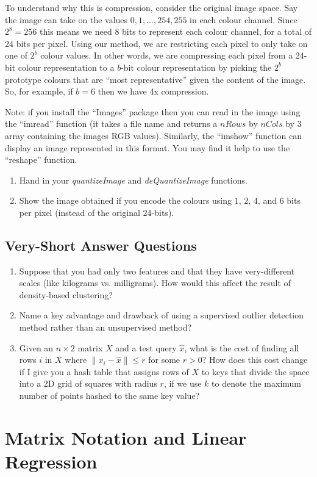 \documentclass{article}
\def\blu#1{{\color{blu}#1}}
\def\norm#1{\|#1\|}
\def\enum#1{\begin{enumerate}#1\end{enumerate}}
\begin{document}
To understand why this is compression, consider the original image space. Say the image can take on the values $0,1,\ldots,254,255$ in each colour channel. Since $2^8=256$ this means we need 8 bits to represent each colour channel, for a total of 24 bits per pixel. Using our method, we are restricting each pixel to only take on one of $2^b$ colour values. In other words, we are compressing each pixel from a 24-bit colour representation to a $b$-bit colour representation by picking the $2^b$ prototype colours that are ``most representative'' given the content of the image. So, for example, if $b=6$ then we have 4x compression.

Note: if you install the ``Images'' package then you can read in the image using the ``imread'' function (it takes a file name and returns a $nRows$ by $nCols$ by $3$ array containing the images RGB values). Similarly, the ``imshow'' function can display an image represented in this format. You may find it help to use the ``reshape'' function.

\blu{\enum{
\item Hand in your \emph{quantizeImage} and \emph{deQuantizeImage} functions.
\item Show the image obtained if you encode the colours using $1$, $2$, $4$, and $6$ bits per pixel (instead of the original 24-bits).
}}

\subsection{Very-Short Answer Questions}

\blu{
\enum{
\item Suppose that you had only two features and that they have very-different scales (like kilograms vs. milligrams). How would this affect the result of density-based clustering?
\item Name a key advantage and drawback of using a supervised outlier detection method rather than an unsupervised method?
\item Given an $n \times 2$ matrix $X$ and a test query $\hat{x}$, what is the cost of finding all rows $i$ in $X$ where $\norm{x_i - \hat{x}} \leq r$ for some $r > 0$? How does this cost change if I give you a hash table that assigns rows of $X$ to keys that divide the space into a 2D grid of squares with radius $r$, if we use $k$ to denote the maximum number of points hashed to the same key value?
}}

\section{Matrix Notation and Linear Regression}
\end{document}
